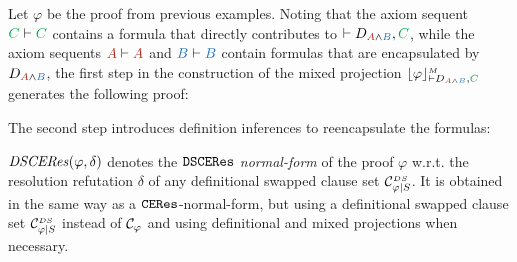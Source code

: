 \begin{example}
\label{example:DWProjectionMixed}
Let $\varphi$ be the proof from previous examples. Noting that the axiom sequent $\hE{C} \seq \hE{C}$ contains a formula that directly contributes to $\seq D_{\hA{A} \structplus \hB{B}} , \hE{C}$, while the axiom sequents $\hA{A} \seq \hA{A}$ and $\hB{B} \seq \hB{B}$ contain formulas that are encapsulated by $D_{\hA{A} \structplus \hB{B}}$, the first step in the construction of the mixed 
projection $\projectionMixed{\varphi}{\seq D_{\hA{A} \structplus \hB{B}} , \hE{C}}$generates the following proof:
%
\begin{prooftree}
		 
	 
								 
\end{prooftree}
%

\noindent
The second step introduces definition inferences to reencapsulate the formulas:
\begin{prooftree}
		 
	 
	 
							 
\end{prooftree}
\hfill\QED
\end{example}

\begin{definition}
$\CEResNFDS{\varphi}{\delta}$ denotes the \emph{$\CEResDS$ normal-form} of the proof $\varphi$ w.r.t. the resolution refutation $\delta$ of any definitional swapped clause set $\clausesetSwapDef{\varphi}{S}$. It is obtained in the same way as a $\CERes$-normal-form, but using a definitional swapped clause set $\clausesetSwapDef{\varphi}{S}$ instead of $\clauseset{\varphi}$ and using definitional and mixed projections when necessary.
\end{definition}

